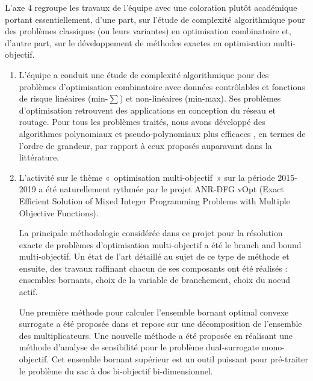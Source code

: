 L'axe 4 regroupe les travaux de l'équipe avec une coloration plutôt académique portant essentiellement, d'une part, sur l'étude de complexité algorithmique pour des problèmes classiques (ou leurs variantes) en optimisation combinatoire et, d'autre part, sur le développement de méthodes exactes en optimisation multi-objectif.      

\begin{enumerate}
    \item L’équipe a conduit une étude de complexité algorithmique pour des problèmes d'optimisation combinatoire avec données contrôlables et fonctions de risque linéaires (min-$\sum$) et non-linéaires (min-max). Ses problèmes d’optimisation retrouvent des applications en conception du réseau et routage. Pour tous les problèmes traités, nous avons développé des algorithmes polynomiaux et pseudo-polynomiaux plus efficaces \cite{Gurevsky2015,Gurevsky2016a,Gurevsky2016b,Gurevsky2020}, en termes de l'ordre de grandeur, par rapport à ceux proposés auparavant dans la littérature. 
    
    \item L’activité sur le thème « optimisation multi-objectif » sur la période 2015-2019 a été naturellement rythmée par le projet ANR-DFG vOpt (Exact Efficient Solution of Mixed Integer Programming Problems with Multiple Objective Functions).


La principale méthodologie considérée dans ce projet pour la résolution exacte de problèmes d’optimisation multi-objectif a été le branch and bound multi-objectif. Un état de l’art détaillé au sujet de ce type de méthode \cite{przybylski:hal-01717951} et ensuite, des travaux raffinant chacun de ses composants ont été réalisés : ensembles bornants, choix de la variable de branchement, choix du noeud actif. 


Une première méthode pour calculer l’ensemble bornant optimal convexe surrogate a été proposée dans \cite{cerqueus:hal-01158355} et repose sur une décomposition de l’ensemble des multiplicateurs. Une nouvelle méthode \cite{przybylski:hal-02480174} a été proposée en réalisant une méthode d’analyse de sensibilité pour le problème dual-surrogate mono-objectif. Cet ensemble bornant supérieur est un outil puissant pour pré-traiter le problème du sac à dos bi-objectif bi-dimensionnel.


\end{enumerate}

